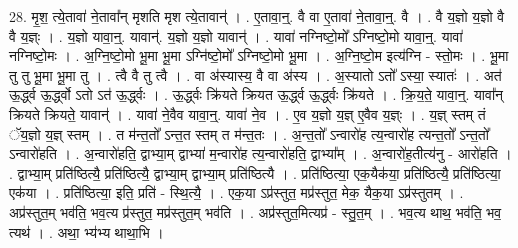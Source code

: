 \documentclass[17pt]{extarticle}
\begin{document}
28. मृ॒श॒ त्ये॒तावा॑ ने॒तावा᳚न् मृशति मृश त्ये॒तावान्॑ । . ए॒तावा॒न्॒. वै वा ए॒तावा॑ ने॒तावा॒न्॒. वै । . वै य॒ज्ञो य॒ज्ञो वै वै य॒ज्ञ्ः । . य॒ज्ञो यावा॒न्॒. यावान्॑. य॒ज्ञो य॒ज्ञो यावान्॑ । . यावा॑ नग्निष्टो॒मो᳚ ऽग्निष्टो॒मो यावा॒न्॒. यावा॑ नग्निष्टो॒मः । . अ॒ग्नि॒ष्टो॒मो भू॒मा भू॒मा ऽग्नि॑ष्टो॒मो᳚ ऽग्निष्टो॒मो भू॒मा । . अ॒ग्नि॒ष्टो॒म इत्य॑ग्नि - स्तो॒मः । . भू॒मा तु तु भू॒मा भू॒मा तु । . त्वै वै तु त्वै । . वा अ॑स्यास्य॒ वै वा अ॑स्य । . अ॒स्यातो ऽतो᳚ ऽस्या॒ स्यातः॑ । . अत॑ ऊ॒र्द्ध्व ऊ॒र्द्ध्वो ऽतो ऽत॑ ऊ॒र्द्ध्वः । . ऊ॒र्द्ध्वः क्रि॑यते क्रियत ऊ॒र्द्ध्व ऊ॒र्द्ध्वः क्रि॑यते । . क्रि॒य॒ते॒ यावा॒न्॒. यावा᳚न् क्रियते क्रियते॒ यावान्॑ । . यावा॑ ने॒वैव यावा॒न्॒. यावा॑ ने॒व । . ए॒व य॒ज्ञो य॒ज्ञ् ए॒वैव य॒ज्ञ्ः । . य॒ज्ञ् स्तम् तं ॅय॒ज्ञो य॒ज्ञ् स्तम् । . त म॑न्त॒तो᳚ ऽन्त॒त स्तम् त म॑न्त॒तः । . अ॒न्त॒तो᳚ ऽन्वारो॑ह त्य॒न्वारो॑ह त्यन्त॒तो᳚ ऽन्त॒तो᳚ ऽन्वारो॑हति । . अ॒न्वारो॑हति॒ द्वाभ्या॒म् द्वाभ्या॑ म॒न्वारो॑ह त्य॒न्वारो॑हति॒ द्वाभ्या᳚म् । . अ॒न्वारो॑ह॒तीत्य॑नु - आरो॑हति । . द्वाभ्या॒म् प्रति॑ष्ठित्यै॒ प्रति॑ष्ठित्यै॒ द्वाभ्या॒म् द्वाभ्या॒म् प्रति॑ष्ठित्यै । . प्रति॑ष्ठित्या॒ एक॒यैक॑या॒ प्रति॑ष्ठित्यै॒ प्रति॑ष्ठित्या॒ एक॑या । . प्रति॑ष्ठित्या॒ इति॒ प्रति॑ - स्थि॒त्यै॒ । . एक॒या ऽप्र॑स्तुत॒ मप्र॑स्तुत॒ मेक॒ यैक॒या ऽप्र॑स्तुतम् । . अप्र॑स्तुत॒म् भव॑ति॒ भव॒त्य प्र॑स्तुत॒ मप्र॑स्तुत॒म् भव॑ति । . अप्र॑स्तुत॒मित्यप्र॑ - स्तु॒त॒म् । . भव॒त्य थाथ॒ भव॑ति॒ भव॒ त्यथ॑ । . अथा॒ भ्य॑भ्य थाथा॒भि । \newline
\end{document}
